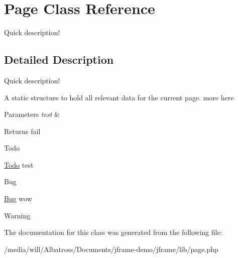 \hypertarget{classPage}{\section{Page Class Reference}
\label{classPage}
}


Quick description!  




\subsection{Detailed Description}
Quick description! 

A static structure to hold all relevant data for the current page. more here 
\begin{DoxyParams}{Parameters}
{\em test} & \\
\hline
\end{DoxyParams}
\begin{DoxyReturn}{Returns}
fail 
\end{DoxyReturn}
\begin{DoxyRefDesc}{Todo}
\item[\hyperlink{todo__todo000001}{Todo}]test \end{DoxyRefDesc}
\begin{DoxyRefDesc}{Bug}
\item[\hyperlink{bug__bug000001}{Bug}]wow \begin{DoxyWarning}{Warning}

\end{DoxyWarning}
\end{DoxyRefDesc}


The documentation for this class was generated from the following file\+:\begin{DoxyCompactItemize}
\item 
/media/will/\+Albatross/\+Documents/jframe-\/demo/jframe/lib/page.\+php\end{DoxyCompactItemize}
